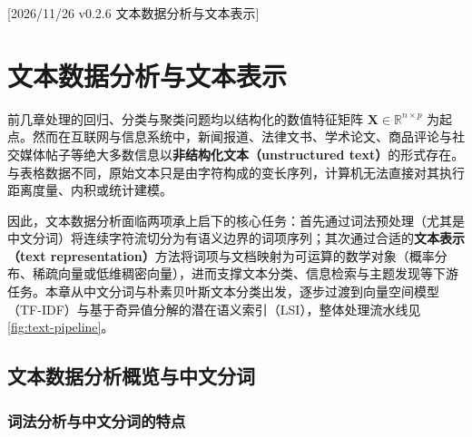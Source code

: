 %
%
[2026/11/26 v0.2.6 文本数据分析与文本表示]

\chapter{文本数据分析与文本表示}\label{ch:text-analysis}

前几章处理的回归、分类与聚类问题均以结构化的数值特征矩阵 $\mathbf{X}\in\mathbb{R}^{n\times p}$ 为起点。然而在互联网与信息系统中，新闻报道、法律文书、学术论文、商品评论与社交媒体帖子等绝大多数信息以\textbf{非结构化文本（unstructured text）}的形式存在。与表格数据不同，原始文本只是由字符构成的变长序列，计算机无法直接对其执行距离度量、内积或统计建模。

因此，文本数据分析面临两项承上启下的核心任务：首先通过词法预处理（尤其是中文分词）将连续字符流切分为有语义边界的词项序列；其次通过合适的\textbf{文本表示（text representation）}方法将词项与文档映射为可运算的数学对象（概率分布、稀疏向量或低维稠密向量），进而支撑文本分类、信息检索与主题发现等下游任务。本章从中文分词与朴素贝叶斯文本分类出发，逐步过渡到向量空间模型（TF-IDF）与基于奇异值分解的潜在语义索引（LSI），整体处理流水线见\cref{fig:text-pipeline}。


\section{文本数据分析概览与中文分词}\label{sec:text-overview-seg}

\subsection{词法分析与中文分词的特点}


